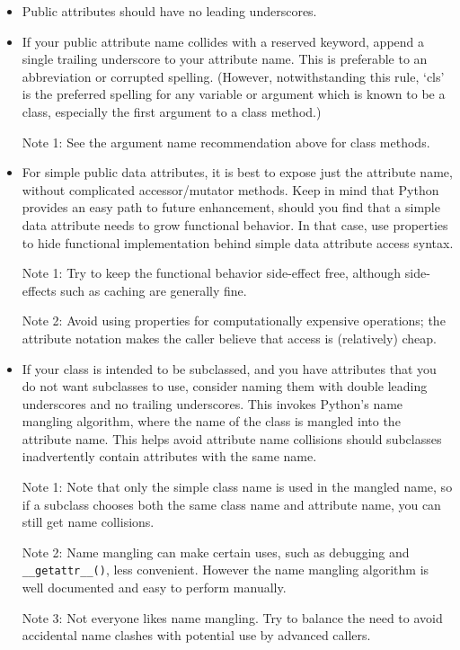 \documentclass[a4paper,11pt]{article}
\begin{document}
\begin{itemize}
\item Public attributes should have no leading underscores.
\item If your public attribute name collides with a reserved keyword, append 
a single trailing underscore to your attribute name. This is preferable to an 
abbreviation or corrupted spelling. (However, notwithstanding this rule, 
‘cls’ is the preferred spelling for any variable or argument which is known 
to be a class, especially the first argument to a class method.)
\par
Note 1: See the argument name recommendation above for class methods.
\item For simple public data attributes, it is best to expose just the 
attribute name, without complicated accessor/mutator methods. Keep in mind 
that Python provides an easy path to future enhancement, should you find that 
a simple data attribute needs to grow functional behavior. In that case, use 
properties to hide functional implementation behind simple data attribute 
access syntax.
\par
Note 1: Try to keep the functional behavior side-effect free, although 
side-effects such as caching are generally fine.
\par
Note 2: Avoid using properties for computationally expensive operations; the 
attribute notation makes the caller believe that access is (relatively) cheap.
\item If your class is intended to be subclassed, and you have attributes 
that you do not want subclasses to use, consider naming them with double 
leading underscores and no trailing underscores. This invokes Python’s name 
mangling algorithm, where the name of the class is mangled into the attribute 
name. This helps avoid attribute name collisions should subclasses 
inadvertently contain attributes with the same name.
\par
Note 1: Note that only the simple class name is used in the mangled name, so 
if a subclass chooses both the same class name and attribute name, you can 
still get name collisions.
\par
Note 2: Name mangling can make certain uses, such as debugging and 
\verb"__getattr__()", less convenient. However the name mangling algorithm is 
well documented and easy to perform manually.
\par
Note 3: Not everyone likes name mangling. Try to balance the need to avoid 
accidental name clashes with potential use by advanced callers.
\end{itemize}
\end{document}
